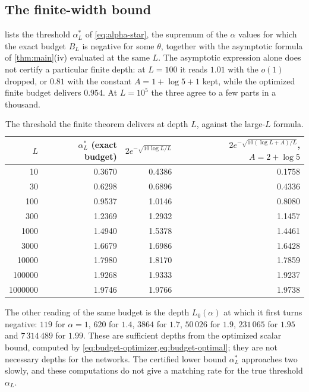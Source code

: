 \subsection{The finite-width bound}

 lists the threshold $\alpha^*_L$ of \cref{eq:alpha-star}, the supremum of the $\alpha$ values for which the exact budget $B_L$ is negative for some $\theta$, together with the asymptotic formula of \cref{thm:main}(iv) evaluated at the same $L$. The asymptotic expression alone does not certify a particular finite depth: at $L=100$ it reads $1.01$ with the $o(1)$ dropped, or $0.81$ with the constant $A=1+\log5+1$ kept, while the optimized finite budget delivers $0.954$. At $L=10^5$ the three agree to a few parts in a thousand.

\begin{table}[h]\centering
\begin{tabular}{rrrr}
\toprule
$L$ & $\alpha^*_L$ (exact budget) & $2e^{-\sqrt{10\log L/L}}$ & $2e^{-\sqrt{10(\log L+A)/L}}$, $A=2+\log5$\\
\midrule
10 & 0.3670 & 0.4386 & 0.1758\\
30 & 0.6298 & 0.6896 & 0.4336\\
100 & 0.9537 & 1.0146 & 0.8080\\
300 & 1.2369 & 1.2932 & 1.1457\\
1000 & 1.4940 & 1.5378 & 1.4461\\
3000 & 1.6679 & 1.6986 & 1.6428\\
10000 & 1.7980 & 1.8170 & 1.7859\\
100000 & 1.9268 & 1.9333 & 1.9237\\
1000000 & 1.9746 & 1.9766 & 1.9738\\
\bottomrule
\end{tabular}
\caption{The threshold the finite theorem delivers at depth $L$, against the large-$L$ formula.}
\label{tab:threshold}
\end{table}

The other reading of the same budget is the depth $L_0(\alpha)$ at which it first turns negative: $119$ for $\alpha=1$, $620$ for $1.4$, $3864$ for $1.7$, $50\,026$ for $1.9$, $231\,065$ for $1.95$ and $7\,314\,489$ for $1.99$. These are sufficient depths from the optimized scalar bound, computed by \cref{eq:budget-optimizer,eq:budget-optimal}; they are not necessary depths for the networks. The certified lower bound $\alpha_L^*$ approaches two slowly, and these computations do not give a matching rate for the true threshold $\alpha_L$.


